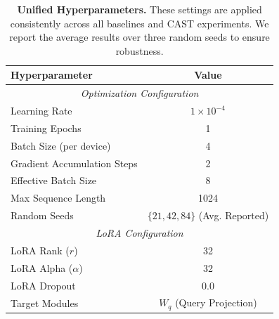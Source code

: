 \begin{table}[!t]
    \centering
    \small
    \renewcommand{\arraystretch}{1.2}
    \begin{tabular}{lc}
    \toprule
    \textbf{Hyperparameter} & \textbf{Value} \\
    \midrule
    \multicolumn{2}{c}{\textit{Optimization Configuration}} \\
    Learning Rate & $1 \times 10^{-4}$ \\
    Training Epochs & 1 \\
    Batch Size (per device) & 4 \\
    Gradient Accumulation Steps & 2 \\
    Effective Batch Size & 8 \\
    Max Sequence Length & 1024 \\
    Random Seeds & $\{21, 42, 84\}$ (Avg. Reported) \\
    \midrule
    \multicolumn{2}{c}{\textit{LoRA Configuration}} \\
    LoRA Rank ($r$) & 32 \\
    LoRA Alpha ($\alpha$) & 32 \\
    LoRA Dropout & 0.0 \\
    Target Modules & $W_q$ (Query Projection) \\
    \bottomrule
    \end{tabular}
    \caption{\textbf{Unified Hyperparameters.} These settings are applied consistently across all baselines and CAST experiments. We report the average results over three random seeds to ensure robustness.}
    \label{tab:hyperparameters}
\end{table}